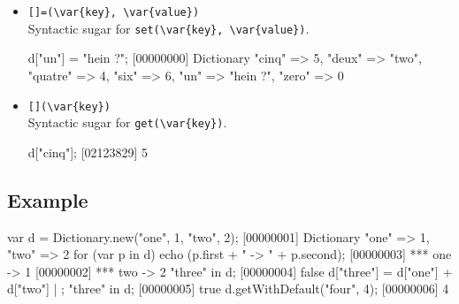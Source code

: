 \begin{itemize}
\item \lstinline|[]=(\var{key}, \var{value})|\\
  Syntactic sugar for \lstinline|set(\var{key}, \var{value})|.

\begin{urbiscript}[firstnumber=last]
d["un"] = "hein ?";
[00000000] Dictionary {"cinq" => 5, "deux" => "two", "quatre" => 4, "six" => 6, "un" => "hein ?", "zero" => 0}
\end{urbiscript}

\item \lstinline|[](\var{key})|\\
  Syntactic sugar for \lstinline|get(\var{key})|.

\begin{urbiscript}[firstnumber=last]
d["cinq"];
[02123829] 5
\end{urbiscript}

\end{itemize}

\subsection{Example}

\begin{urbiscript}
var d = Dictionary.new("one", 1, "two", 2);
[00000001] Dictionary {"one" => 1, "two" => 2}
for (var p in d)
  echo (p.first + " -> " + p.second);
[00000003] *** one -> 1
[00000002] *** two -> 2
"three" in d;
[00000004] false
d["three"] = d["one"] + d["two"] | {};
"three" in d;
[00000005] true
d.getWithDefault("four", 4);
[00000006] 4
\end{urbiscript}

